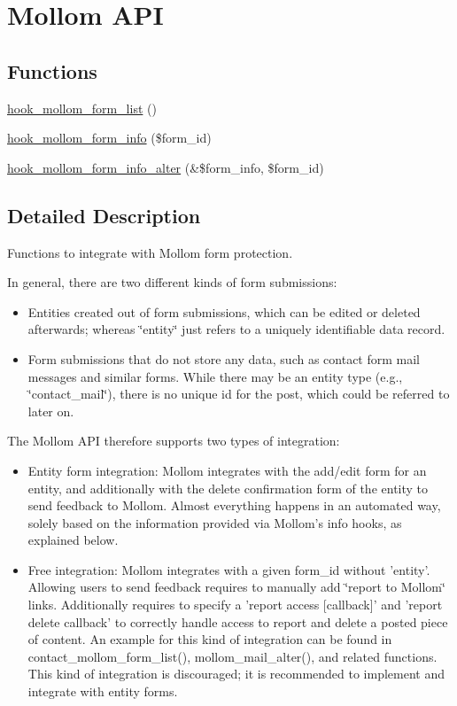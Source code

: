 \hypertarget{group__mollom__api}{
\section{Mollom API}
\label{group__mollom__api}
}
\subsection*{Functions}
\begin{CompactItemize}
\item 
\hyperlink{group__mollom__api_gdd309b0309f638d79b17a686ea96f564}{hook\_\-mollom\_\-form\_\-list} ()
\item 
\hyperlink{group__mollom__api_ga5150fd4fabe048cbdeb41ec10908658}{hook\_\-mollom\_\-form\_\-info} (\$form\_\-id)
\item 
\hyperlink{group__mollom__api_gd0e440366ce3bd86317641b94693cbe6}{hook\_\-mollom\_\-form\_\-info\_\-alter} (\&\$form\_\-info, \$form\_\-id)
\end{CompactItemize}


\subsection{Detailed Description}
Functions to integrate with Mollom form protection.

In general, there are two different kinds of form submissions:\begin{itemize}
\item Entities created out of form submissions, which can be edited or deleted afterwards; whereas \char`\"{}entity\char`\"{} just refers to a uniquely identifiable data record.\item Form submissions that do not store any data, such as contact form mail messages and similar forms. While there may be an entity type (e.g., \char`\"{}contact\_\-mail\char`\"{}), there is no unique id for the post, which could be referred to later on.\end{itemize}


The Mollom API therefore supports two types of integration:\begin{itemize}
\item Entity form integration: Mollom integrates with the add/edit form for an entity, and additionally with the delete confirmation form of the entity to send feedback to Mollom. Almost everything happens in an automated way, solely based on the information provided via Mollom's info hooks, as explained below.\item Free integration: Mollom integrates with a given form\_\-id without 'entity'. Allowing users to send feedback requires to manually add \char`\"{}report to Mollom\char`\"{} links. Additionally requires to specify a 'report access \mbox{[}callback\mbox{]}' and 'report delete callback' to correctly handle access to report and delete a posted piece of content. An example for this kind of integration can be found in contact\_\-mollom\_\-form\_\-list(), mollom\_\-mail\_\-alter(), and related functions. This kind of integration is discouraged; it is recommended to implement and integrate with entity forms.\end{itemize}


